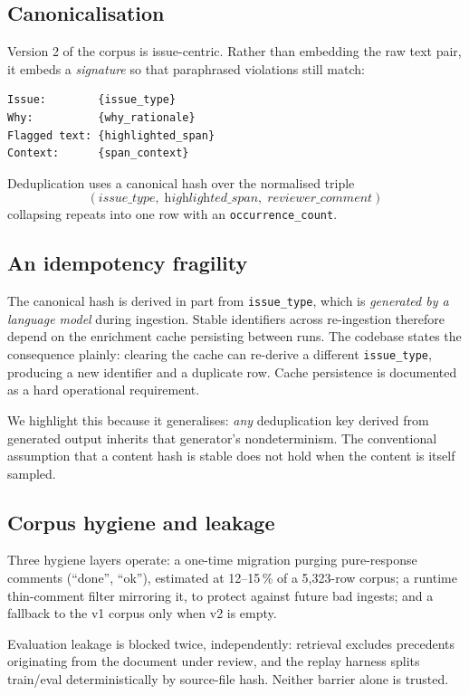 \documentclass[10pt]{article}
\newcommand{\code}[1]{\texttt{\small #1}}
\begin{document}
\subsection{Canonicalisation}

Version 2 of the corpus is issue-centric. Rather than embedding the raw text
pair, it embeds a \emph{signature} so that paraphrased violations still match:

\begin{lstlisting}
Issue:        {issue_type}
Why:          {why_rationale}
Flagged text: {highlighted_span}
Context:      {span_context}
\end{lstlisting}

Deduplication uses a canonical hash over the normalised triple
\[
  (\textit{issue\_type},\; \textit{highlighted\_span},\; \textit{reviewer\_comment})
\]
collapsing repeats into one row with an \code{occurrence\_count}.

\subsection{An idempotency fragility}

The canonical hash is derived in part from \code{issue\_type}, which is
\emph{generated by a language model} during ingestion. Stable identifiers
across re-ingestion therefore depend on the enrichment cache persisting between
runs. The codebase states the consequence plainly: clearing the cache can
re-derive a different \code{issue\_type}, producing a new identifier and a
duplicate row. Cache persistence is documented as a hard operational
requirement.

We highlight this because it generalises: \emph{any} deduplication key derived
from generated output inherits that generator's nondeterminism. The
conventional assumption that a content hash is stable does not hold when the
content is itself sampled.

\subsection{Corpus hygiene and leakage}

Three hygiene layers operate: a one-time migration purging pure-response
comments (``done'', ``ok''), estimated at 12--15\,\% of a 5{,}323-row corpus; a
runtime thin-comment filter mirroring it, to protect against future bad
ingests; and a fallback to the v1 corpus only when v2 is empty.

Evaluation leakage is blocked twice, independently: retrieval excludes
precedents originating from the document under review, and the replay harness
splits train/eval deterministically by source-file hash. Neither barrier alone
is trusted.
\end{document}
